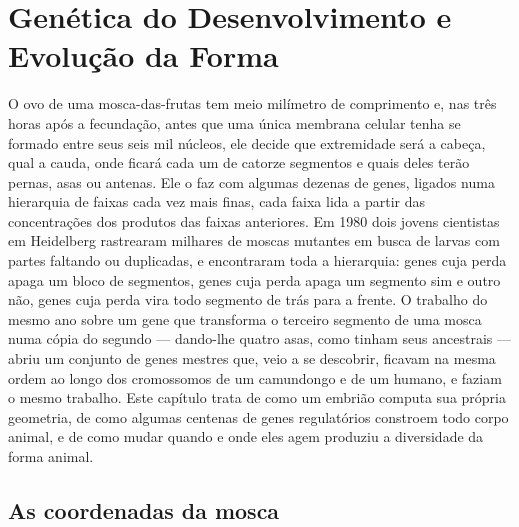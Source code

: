 \chapter{Genética do Desenvolvimento e Evolução da Forma}\label{ch:b3:developmental-genetics}

O ovo de uma mosca-das-frutas tem meio milímetro de comprimento e, nas
três horas após a fecundação, antes que uma única membrana celular tenha
se formado entre seus seis mil núcleos, ele decide que extremidade será
a cabeça, qual a cauda, onde ficará cada um de catorze segmentos e quais
deles terão pernas, asas ou antenas. Ele o faz com algumas dezenas de
genes, ligados numa hierarquia de faixas cada vez mais finas, cada faixa
lida a partir das concentrações dos produtos das faixas anteriores. Em
1980 dois jovens cientistas em Heidelberg rastrearam milhares de moscas
mutantes em busca de larvas com partes faltando ou duplicadas, e
encontraram toda a hierarquia: genes cuja perda apaga um bloco de
segmentos, genes cuja perda apaga um segmento sim e outro não, genes
cuja perda vira todo segmento de trás para a frente. O trabalho do mesmo
ano sobre um gene que transforma o terceiro segmento de uma mosca numa
cópia do segundo --- dando-lhe quatro asas, como tinham seus ancestrais
--- abriu um conjunto de genes mestres que, veio a se descobrir,
ficavam na mesma ordem ao longo dos cromossomos de um camundongo e de um
humano, e faziam o mesmo trabalho. Este capítulo trata de como um embrião
computa sua própria geometria, de como algumas centenas de genes
regulatórios constroem todo corpo animal, e de como mudar quando e onde
eles agem produziu a diversidade da forma animal.

\section{As coordenadas da mosca}

